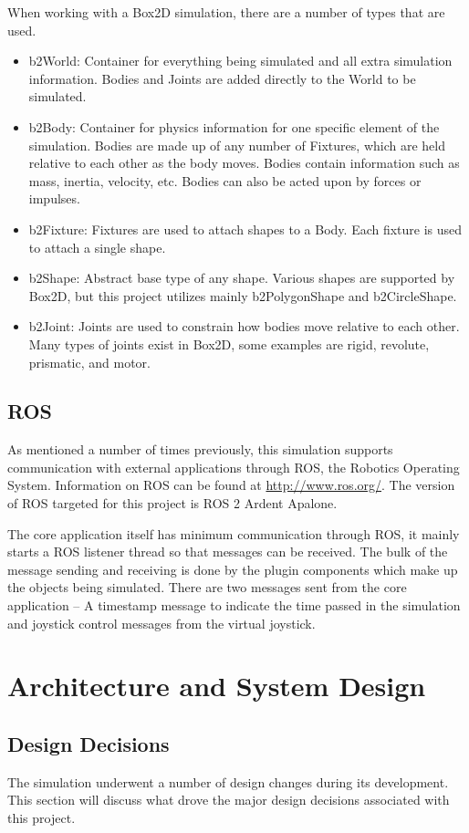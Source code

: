 When working with a Box2D simulation, there are a number of types that are used.
\begin{itemize}
	\item b2World: Container for everything being simulated and all extra simulation information. Bodies and Joints are added directly to the World to be simulated.
	\item b2Body: Container for physics information for one specific element of the simulation. Bodies are made up of any number of Fixtures, which are held relative to each other as the body moves. Bodies contain information such as mass, inertia, velocity, etc. Bodies can also be acted upon by forces or impulses.
	\item b2Fixture: Fixtures are used to attach shapes to a Body. Each fixture is used to attach a single shape.
	\item b2Shape: Abstract base type of any shape. Various shapes are supported by Box2D, but this project utilizes mainly b2PolygonShape and b2CircleShape.
	\item b2Joint: Joints are used to constrain how bodies move relative to each other. Many types of joints exist in Box2D, some examples are rigid, revolute, prismatic, and motor.
\end{itemize}

\subsection{ROS}
As mentioned a number of times previously, this simulation supports communication with external applications through ROS, the Robotics Operating System. Information on ROS can be found at \url{http://www.ros.org/}. The version of ROS targeted for this project is ROS 2 Ardent Apalone.

The core application itself has minimum communication through ROS, it mainly starts a ROS listener thread so that messages can be received. The bulk of the message sending and receiving is done by the plugin components which make up the objects being simulated. There are two messages sent from the core application -- A timestamp message to indicate the time passed in the simulation and joystick control messages from the virtual joystick.

\newpage
 \section{Architecture and System Design} 	
 \subsection{Design Decisions}
  	The simulation underwent a number of design changes during its development. This section will discuss what drove the major design decisions associated with this project.
